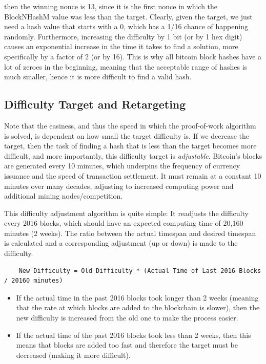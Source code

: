 \documentclass{article}
\newcounter{algo}[section]
\begin{document}
    then the winning nonce is 13, since it is the first nonce in which the BlockNHashM value was less than the target. Clearly, given the target, we just need a hash value that starts with a 0, which has a 1/16 chance of happening randomly. Furthermore, increasing the difficulty by 1 bit (or by 1 hex digit) causes an exponential increase in the time it takes to find a solution, more specifically by a factor of 2 (or by 16). This is why all bitcoin block hashes have a lot of zeroes in the beginning, meaning that the acceptable range of hashes is much smaller, hence it is more difficult to find a valid hash.

  \subsection{Difficulty Target and Retargeting}

    Note that the easiness, and thus the speed in which the proof-of-work algorithm is solved, is dependent on how small the target difficulty is. If we decrease the target, then the task of finding a hash that is less than the target becomes more difficult, and more importantly, this difficulty target is \textit{adjustable}. Bitcoin's blocks are generated every 10 minutes, which underpins the frequency of currency issuance and the speed of transaction settlement. It must remain at a constant 10 minutes over many decades, adjusting to increased computing power and additional mining nodes/competition.

    This difficulty adjustment algorithm is quite simple: It readjusts the difficulty every 2016 blocks, which should have an expected computing time of 20,160 minutes (2 weeks). The ratio between the actual timespan and desired timespan is calculated and a corresponding adjustment (up or down) is made to the difficulty.

    \begin{lstlisting}
    New Difficulty = Old Difficulty * (Actual Time of Last 2016 Blocks / 20160 minutes)
    \end{lstlisting}

    \begin{itemize}
      \item If the actual time in the past 2016 blocks took longer than 2 weeks (meaning that the rate at which blocks are added to the blockchain is slower), then the new difficulty is increased from the old one to make the process easier.
      \item If the actual time of the past 2016 blocks took less than 2 weeks, then this means that blocks are added too fast and therefore the target must be decreased (making it more difficult).
    \end{itemize}
\end{document}
